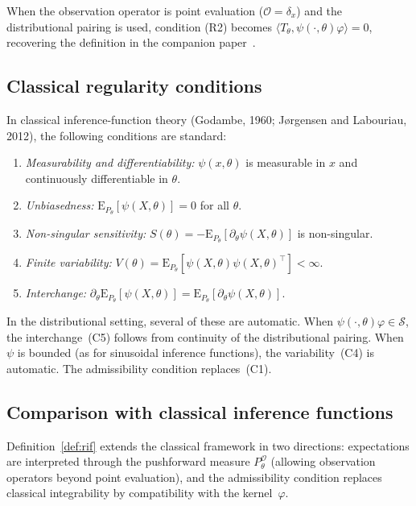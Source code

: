 \documentclass[11pt,a4paper]{article}
\newcommand{\E}{\mathrm{E}}
\begin{document}
When the observation operator is point evaluation ($\mathcal O = \delta_x$)
and the distributional pairing is used, condition (R2) becomes
$\langle T_\theta, \psi(\cdot, \theta)\varphi \rangle = 0$, recovering the
definition in the companion paper~\cite{LabouriauA2}.

\subsection{Classical regularity conditions}\label{subsec:classical-reg}

In classical inference-function theory (Godambe, 1960; J{\o}rgensen and
Labouriau, 2012), the following conditions are standard:

\begin{enumerate}[label=(C\arabic*)]
\item \emph{Measurability and differentiability:} $\psi(x,\theta)$ is
measurable in $x$ and continuously differentiable in $\theta$.

\item \emph{Unbiasedness:} $\E_{P_\theta}[\psi(X,\theta)] = 0$ for all
$\theta$.

\item \emph{Non-singular sensitivity:}
$S(\theta) = -\E_{P_\theta}[\partial_\theta \psi(X,\theta)]$ is non-singular.

\item \emph{Finite variability:}
$V(\theta) = \E_{P_\theta}[\psi(X,\theta)\psi(X,\theta)^\top] < \infty$.

\item \emph{Interchange:}
$\partial_\theta \E_{P_\theta}[\psi(X,\theta)]
= \E_{P_\theta}[\partial_\theta \psi(X,\theta)]$.
\end{enumerate}

In the distributional setting, several of these are automatic.  When
$\psi(\cdot, \theta)\varphi \in \mathcal S$, the interchange~(C5) follows
from continuity of the distributional pairing.  When $\psi$ is bounded
(as for sinusoidal inference functions), the variability~(C4) is automatic.
The admissibility condition replaces~(C1).

\subsection{Comparison with classical inference functions}\label{subsec:comparison}

Definition~\ref{def:rif} extends the classical framework in two directions:
expectations are interpreted through the pushforward measure
$P_\theta^{\mathcal O}$ (allowing observation operators beyond point
evaluation), and the admissibility condition replaces classical
integrability by compatibility with the kernel~$\varphi$.
\end{document}
